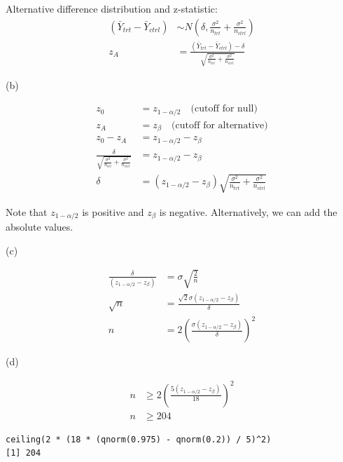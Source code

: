 \documentclass[11pt]{article}
\begin{document}
Alternative difference distribution and z-statistic:
\begin{align*}
(\bar{Y}_{trt} - \bar{Y}_{ctrl}) &\sim N(\delta, \frac{\sigma^2}{n_{trt}} + \frac{\sigma^2}{n_{ctrl}})\\
z_A &= \frac{(\bar{Y}_{trt} - \bar{Y}_{ctrl}) - \delta}{\sqrt{\frac{\sigma^2}{n_{trt}} + \frac{\sigma^2}{n_{ctrl}}}}
\end{align*}

\vspace{0.1in}

\noindent (b)

\begin{align*}
z_0 &= z_{1-\alpha/2} \quad \textrm{(cutoff for null)}\\
z_A &= z_{\beta} \quad \textrm{(cutoff for alternative)}\\
z_0 - z_A &= z_{1-\alpha/2} - z_\beta\\
\frac{\delta}{\sqrt{\frac{\sigma^2}{n_{trt}} + \frac{\sigma^2}{n_{ctrl}}}} &= z_{1-\alpha/2} - z_\beta\\
\delta &= (z_{1-\alpha/2} - z_\beta)\sqrt{\frac{\sigma^2}{n_{trt}} + \frac{\sigma^2}{n_{ctrl}}}
\end{align*}

Note that $z_{1-\alpha/2}$ is positive and $z_\beta$ is negative.  Alternatively, we can add the absolute values.

\vspace{0.1in}

\noindent (c)

\begin{align*}
\frac{\delta}{(z_{1-\alpha/2} - z_\beta)} &= \sigma \sqrt{\frac{2}{n}}\\
\sqrt{n} &= \frac{\sqrt{2}\sigma(z_{1-\alpha/2} - z_\beta)}{\delta}\\
n &= 2\left( \frac{\sigma (z_{1-\alpha/2} - z_\beta)}{\delta} \right)^2
\end{align*}

\vspace{0.1in}

\noindent (d)

\begin{align*}
n &\ge 2\left( \frac{5 (z_{1-\alpha/2} - z_\beta)}{18} \right)^2\\
n &\ge 204
\end{align*}

\begin{verbatim}
ceiling(2 * (18 * (qnorm(0.975) - qnorm(0.2)) / 5)^2)
[1] 204
\end{verbatim}
\end{document}
